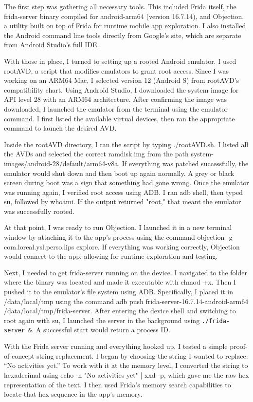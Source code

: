 The first step was gathering all necessary tools. This included Frida itself, the frida-server binary compiled for android-arm64 (version 16.7.14), and Objection, a utility built on top of Frida for runtime mobile app exploration. I also installed the Android command line tools directly from Google’s site, which are separate from Android Studio’s full IDE.

With those in place, I turned to setting up a rooted Android emulator. I used rootAVD, a script that modifies emulators to grant root access. Since I was working on an ARM64 Mac, I selected version 12 (Android S) from rootAVD’s compatibility chart. Using Android Studio, I downloaded the system image for API level 28 with an ARM64 architecture. After confirming the image was downloaded, I launched the emulator from the terminal using the emulator command. I first listed the available virtual devices, then ran the appropriate command to launch the desired AVD.

Inside the rootAVD directory, I ran the script by typing ./rootAVD.sh. I listed all the AVDs and selected the correct ramdisk.img from the path system-images/android-28/default/arm64-v8a. If everything was patched successfully, the emulator would shut down and then boot up again normally. A grey or black screen during boot was a sign that something had gone wrong. Once the emulator was running again, I verified root access using ADB. I ran adb shell, then typed su, followed by whoami. If the output returned "root," that meant the emulator was successfully rooted.

At that point, I was ready to run Objection. I launched it in a new terminal window by attaching it to the app’s process using the command objection -g com.loreal.ysl.perso.lips explore. If everything was working correctly, Objection would connect to the app, allowing for runtime exploration and testing.

Next, I needed to get frida-server running on the device. I navigated to the folder where the binary was located and made it executable with chmod +x. Then I pushed it to the emulator’s file system using ADB. Specifically, I placed it in /data/local/tmp using the command adb push frida-server-16.7.14-android-arm64 /data/local/tmp/frida-server. After entering the device shell and switching to root again with su, I launched the server in the background using \texttt{./frida-server \&}. A successful start would return a process ID.

With the Frida server running and everything hooked up, I tested a simple proof-of-concept string replacement. I began by choosing the string I wanted to replace: “No activities yet.” To work with it at the memory level, I converted the string to hexadecimal using echo -n "No activities yet" | xxd -p, which gave me the raw hex representation of the text. I then used Frida’s memory search capabilities to locate that hex sequence in the app’s memory.

